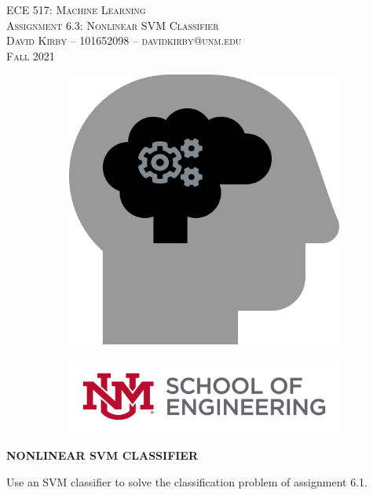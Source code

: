 \documentclass[11pt]{article}
\begin{document}
\setmainfont{SF Pro Text}
\setsansfont{SF Pro Text}
\setmonofont{SF Mono}
\renewcommand{\familydefault}{\sfdefault}

\thispagestyle{empty}
\begin{titlepage}
\vspace*{\fill}
\begin{center}
\textsc{\Huge{ECE 517: Machine Learning}}\\[3em]
\textsc{\LARGE Assignment 6.3: Nonlinear SVM Classifier}\\[6em]
\textsc{\Large David Kirby -- 101652098 -- davidkirby@unm.edu}\\[3em]
\textsc{\Large Fall 2021}
\end{center}
\vfill
\begin{figure}[h]
\begin{subfigure}{0.5\textwidth}
\includegraphics[width=0.25\linewidth]{learning.png}
\end{subfigure}
\begin{subfigure}{0.6\textwidth}\hspace{1em}
\includegraphics[width=0.8\linewidth]{new-soe-logo.png}
\end{subfigure}
\end{figure}
\end{titlepage}
\setcounter{figure}{0}

\hypersetup{
    linkcolor=CrispBlue,
    urlcolor=CrispBlue,
    breaklinks=true
}

\textbf{NONLINEAR SVM CLASSIFIER}

Use an SVM classifier to solve the classification problem of assignment 6.1.
\end{document}
